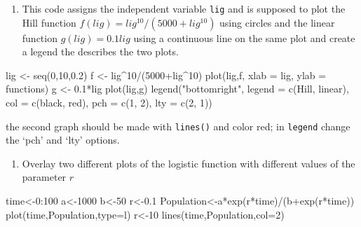 \documentclass[
  letterpaper,
  DIV=11,
  numbers=noendperiod]{scrreprt}
\newenvironment{Shaded}{\begin{snugshade}}{\end{snugshade}}
\newcommand{\NormalTok}[1]{\textcolor[rgb]{0.00,0.23,0.31}{#1}}
\providecommand{\tightlist}{%
  \setlength{\itemsep}{0pt}\setlength{\parskip}{0pt}}\usepackage{longtable,booktabs,array}
\begin{document}
\begin{enumerate}
\def\labelenumi{\arabic{enumi}.}
\setcounter{enumi}{4}
\tightlist
\item
  This code assigns the independent variable \texttt{lig} and is
  supposed to plot the Hill function
  \(f(lig) = lig^{10}/(5000+lig^{10})\) using circles and the linear
  function \(g(lig) = 0.1lig\) using a continuous line on the same plot
  and create a legend the describes the two plots.
\end{enumerate}

\begin{Shaded}
\begin{Highlighting}[]
\NormalTok{lig \textless{}{-} seq(0,10,0.2)}
\NormalTok{f \textless{}{-} lig\^{}10/(5000+lig\^{}10)}
\NormalTok{plot(lig,f, xlab = \textquotesingle{}lig\textquotesingle{}, ylab = \textquotesingle{}functions\textquotesingle{})}
\NormalTok{g \textless{}{-} 0.1*lig}
\NormalTok{plot(lig,g)}
\NormalTok{legend("bottomright", legend = c(\textquotesingle{}Hill\textquotesingle{}, \textquotesingle{}linear\textquotesingle{}), col = c(\textquotesingle{}black\textquotesingle{}, \textquotesingle{}red\textquotesingle{}), pch = c(1, 2), lty = c(2, 1))}
\end{Highlighting}
\end{Shaded}

\begin{tcolorbox}[enhanced jigsaw, arc=.35mm, colframe=quarto-callout-caution-color-frame, left=2mm, opacitybacktitle=0.6, breakable, title=\textcolor{quarto-callout-caution-color}{\faFire}\hspace{0.5em}{Hint}, toprule=.15mm, coltitle=black, bottomtitle=1mm, toptitle=1mm, colback=white, leftrule=.75mm, colbacktitle=quarto-callout-caution-color!10!white, titlerule=0mm, opacityback=0, rightrule=.15mm, bottomrule=.15mm]

the second graph should be made with \texttt{lines()} and color red; in
\texttt{legend} change the `pch' and `lty' options.

\end{tcolorbox}

\begin{enumerate}
\def\labelenumi{\arabic{enumi}.}
\setcounter{enumi}{5}
\tightlist
\item
  Overlay two different plots of the logistic function with different
  values of the parameter \(r\)
\end{enumerate}

\begin{Shaded}
\begin{Highlighting}[]
\NormalTok{time\textless{}{-}0:100}
\NormalTok{a\textless{}{-}1000}
\NormalTok{b\textless{}{-}50 }
\NormalTok{r\textless{}{-}0.1}
\NormalTok{Population\textless{}{-}a*exp(r*time)/(b+exp(r*time)) }
\NormalTok{plot(time,Population,type=\textquotesingle{}l\textquotesingle{}) }
\NormalTok{r\textless{}{-}10 }
\NormalTok{lines(time,Population,col=2)}
\end{Highlighting}
\end{Shaded}
\end{document}
